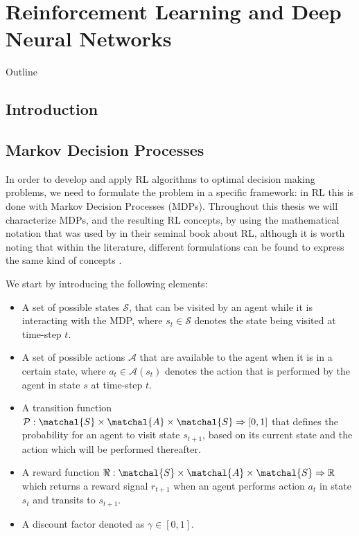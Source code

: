 \chapter{Reinforcement Learning and Deep Neural Networks}
\label{ch:reinforcement_learning}

\begin{remark}{Outline}

\end{remark}

\section{Introduction}
\label{sec:rl_introduction}


\section{Markov Decision Processes}
\label{sec:mdps}

In order to develop and apply RL algorithms to optimal decision making problems, we need to formulate the problem in a specific framework: in RL this is done with Markov Decision Processes (MDPs). Throughout this thesis we will characterize MDPs, and the resulting RL concepts, by using the mathematical notation that was used by \citet{sutton2018reinforcement} in their seminal book about RL, although it is worth noting that within the literature, different formulations can be found to express the same kind of concepts \cite{busoniu2010reinforcement}.

We start by introducing the following elements:
\begin{itemize}
	\item A set of possible states $\mathcal{S}$, that can be visited by an agent while it is interacting with the MDP, where $s_t \in \mathcal{S}$ denotes the state being visited at time-step $t$.
	\item A set of possible actions $\mathcal{A}$ that are available to the agent when it is in a certain state, where $a_t \in \mathcal{A}(s_t)$ denotes the action that is performed by the agent in state $s$ at time-step $t$.
\item A transition function $\mathcal{P}:\matchal{S}\times\matchal{A}\times\matchal{S}\Rightarrow [0,1]$ that defines the probability for an agent to visit state $s_{t+1}$, based on its current state and the action which will be performed thereafter.
\item A reward function $\Re:\matchal{S}\times\matchal{A}\times\matchal{S}\Rightarrow \mathbb{R}$ which returns a reward signal $r_{t+1}$ when an agent performs action $a_t$ in state $s_t$ and transits to $s_{t+1}$.
\item A discount factor denoted as $\gamma \in [0,1]$.

\end{itemize}

